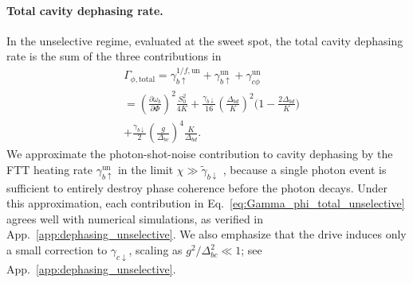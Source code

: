 \paragraph{Total cavity dephasing rate.}
In the unselective regime, evaluated at the sweet spot, the total cavity dephasing rate is the sum of the three contributions in \begin{align}
\label{eq:Gamma_phi_total_unselective}
&\Gamma_{\phi,\mathrm{total}}
=\gamma_{b\uparrow}^{1/f,\mathrm{un}}+\gamma_{b\uparrow}^{\mathrm{un}}+\gamma_{c\phi}^{\mathrm{un}} \nonumber\\
&=\left(\frac{\partial\omega_b}{\partial\Phi}\right)^2\frac{S_0^2}{4K}
+\frac{\gamma_{b\downarrow}}{16}\left(\frac{\Delta_{bd}}{K}\right)^2\bigg(1-\frac{2\Delta_{bd}}{K}\bigg)\nonumber
\\&+\frac{\gamma_{b\downarrow}}{2}\left(\frac{g}{\Delta_{bc}}\right)^4\frac{K}{\Delta_{bd}}.
\end{align}
We approximate the photon-shot-noise contribution to cavity dephasing by the FTT heating rate $\gamma_{b\uparrow}^{\mathrm{un}}$ in the limit $\chi \gg \widetilde{\gamma}_{b\downarrow}$ \cite{serge}, because a single photon event is sufficient to entirely destroy phase coherence before the photon decays. Under this approximation, each contribution in Eq.~\eqref{eq:Gamma_phi_total_unselective} agrees well with numerical simulations, as verified in App.~\ref{app:dephasing_unselective}. We also emphasize that the drive induces only a small correction to $\gamma_{c\downarrow}$, scaling as $g^2/\Delta_{bc}^2 \ll 1$; see App.~\ref{app:dephasing_unselective}.